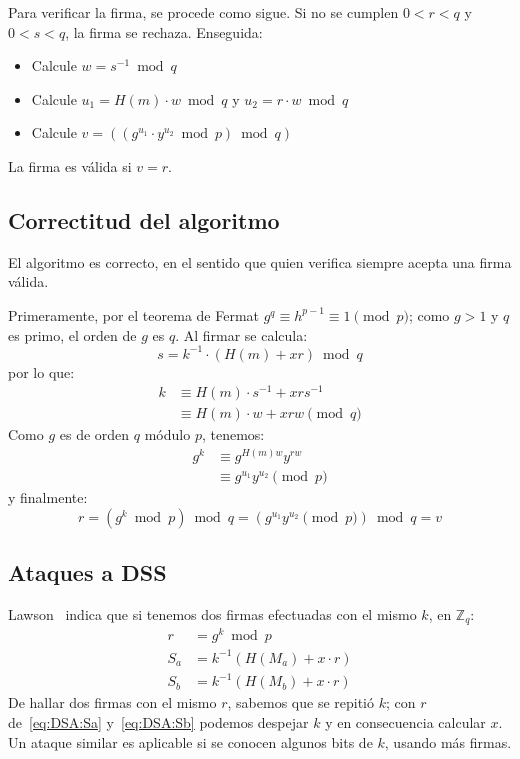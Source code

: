   Para verificar la firma,
  se procede como sigue.
  Si no se cumplen \(0 < r < q\) y \(0 < s < q\),
  la firma se rechaza.
  Enseguida:
  \begin{itemize}
  \item
    Calcule \(w = s^{-1} \bmod q\)
  \item
    Calcule \(u_1 = H(m) \cdot w \bmod q\)
    y \(u_2 = r \cdot w \bmod q\)
  \item
    Calcule \(v = ((g^{u_1} \cdot y^{u_2} \bmod p) \bmod q)\)
  \end{itemize}
  La firma es válida si \(v = r\).

\subsection{Correctitud del algoritmo}
\label{sec:DSA-correcto}

  El algoritmo es correcto,
  en el sentido que quien verifica siempre acepta una firma válida.

  Primeramente,
  por el teorema de Fermat
  \(g^q \equiv h^{p - 1} \equiv 1 \pmod{p}\);
  como \(g > 1\) y \(q\) es primo,
  el orden de \(g\) es \(q\).
  Al firmar se calcula:
  \begin{equation*}
    s = k^{-1} \cdot (H(m) + x r) \bmod q
  \end{equation*}
  por lo que:
  \begin{align*}
    k
      &\equiv H(m) \cdot s^{-1} + x r s^{-1} \\
      &\equiv H(m) \cdot w + x r w \pmod{q}
  \end{align*}
  Como \(g\) es de orden \(q\) módulo \(p\),
  tenemos:
  \begin{align*}
    g^k
      &\equiv g^{H(m) w} y^{r w} \\
      &\equiv g^{u_1} y^{u_2} \pmod{p}
  \end{align*}
  y finalmente:
  \begin{equation*}
    r
      = (g^k \bmod p) \bmod q
      = (g^{u_1} y^{u_2} \pmod p) \bmod q
      = v
  \end{equation*}

\subsection{Ataques a DSS}
\label{sec:ataques-DSS}

  Lawson~\cite{lawson10:_dsa_req_random_value}
  indica que si tenemos dos firmas efectuadas con el mismo \(k\),
  en \(\mathbb{Z}_q\):
  \begin{align}
    r
      &= g^k \bmod p \label{eq:DSA:r} \\
    S_a
      &= k^{-1} (H(M_a) + x \cdot r) \label{eq:DSA:Sa} \\
    S_b
      &= k^{-1} (H(M_b) + x \cdot r) \label{eq:DSA:Sb}
  \end{align}
  De hallar dos firmas con el mismo \(r\),
  sabemos que se repitió \(k\);
  con \(r\) de~\eqref{eq:DSA:Sa} y~\eqref{eq:DSA:Sb}
  podemos despejar \(k\) y en consecuencia calcular \(x\).
  Un ataque similar
  es aplicable si se conocen algunos bits de \(k\),
  usando más firmas.

